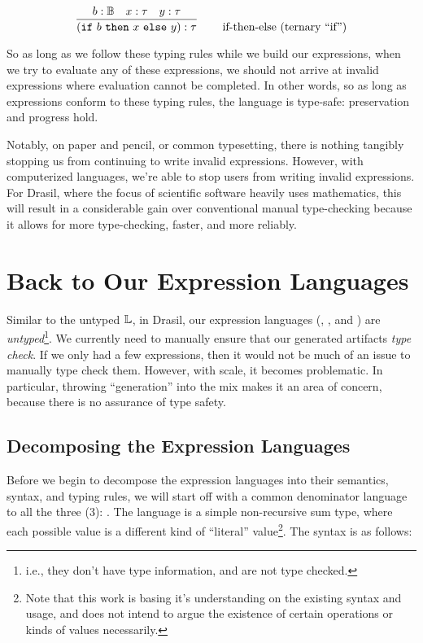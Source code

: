 \begin{equation}
      \left.
      \infer{(\texttt{if}\ b\ \texttt{then}\ x\ \texttt{else}\ y) : \tau}
      {b : \bb{B}  &  x : \tau  &  y : \tau}
      \right.
      \qquad
      \text{if-then-else (ternary ``if'')}
      \label{eq:exTR:ifThenElse}
\end{equation}

So as long as we follow these typing rules while we build our expressions, when
we try to evaluate any of these expressions, we should not arrive at invalid
expressions where evaluation cannot be completed. In other words, so as long as
expressions conform to these typing rules, the language is type-safe:
preservation and progress hold.

Notably, on paper and pencil, or common typesetting, there is nothing tangibly
stopping us from continuing to write invalid expressions. However, with
computerized languages, we're able to stop users from writing invalid
expressions. For Drasil, where the focus of scientific software heavily uses
mathematics, this will result in a considerable gain over conventional manual
type-checking because it allows for more type-checking, faster, and more
reliably.

\section{Back to Our Expression Languages}
\label{chap:typedExpr:sec:back-to-our-expression-languages}

Similar to the untyped \(\mathbb{L}\), in Drasil, our expression languages (\Expr{},
\CodeExpr{}, and \ModelExpr{}) are \textit{untyped}\footnote{i.e., they don't
have type information, and are not type checked.}. We currently need to manually
ensure that our generated artifacts \textit{type check}. If we only had a few
expressions, then it would not be much of an issue to manually type check them.
However, with scale, it becomes problematic. In particular, throwing
``generation'' into the mix makes it an area of concern, because there is no
assurance of type safety.

\subsection{Decomposing the Expression Languages}
\label{chap:typedExpr:sec:back-to-our-expression-languages:subsec:decomposing-the-expression-languages}

Before we begin to decompose the expression languages into their semantics,
syntax, and typing rules, we will start off with a common denominator language
to all the three (3): \Literal{}. The \Literal{} language is a simple
non-recursive sum type, where each possible value is a different kind of
``literal'' value\footnote{Note that this work is basing it's understanding on
      the existing syntax and usage, and does not intend to argue the existence of
      certain operations or kinds of values necessarily.}. The syntax is as follows:

